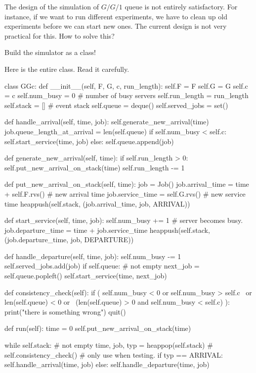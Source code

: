 \documentclass{scrartcl}
\begin{document}
\begin{exercise}
The design of the simulation of $G/G/1$ queue is not entirely satisfactory. For instance, if we want to run different experiments, we have to clean up old experiments before we can start new ones. The current design is not very practical for this. How to solve this?

\hintsymbol\begin{hint}
     Build the simulator as a class!
\end{hint}
\begin{solution}
Here is the entire class. Read it carefully.   


\begin{pyblock}
class GGc:
    def __init__(self, F, G, c, run_length):
        self.F = F
        self.G = G
        self.c = c
        self.num_busy = 0   # number of busy servers
        self.run_length = run_length
        self.stack = [] # event stack
        self.queue = deque()
        self.served_jobs = set()

    def handle_arrival(self, time, job):
        self.generate_new_arrival(time)
        job.queue_length_at_arrival = len(self.queue)
        if self.num_busy < self.c:
            self.start_service(time, job)
        else:
            self.queue.append(job)

    def generate_new_arrival(self, time):
        if self.run_length > 0:
            self.put_new_arrival_on_stack(time)
            self.run_length -= 1

    def put_new_arrival_on_stack(self, time):
        job = Job()
        job.arrival_time = time + self.F.rvs()  # new arrival time
        job.service_time = self.G.rvs()  # new service time
        heappush(self.stack, (job.arrival_time, job, ARRIVAL))

    def start_service(self, time, job):
        self.num_busy += 1  # server becomes busy.
        job.departure_time = time + job.service_time
        heappush(self.stack, (job.departure_time, job, DEPARTURE))

    def handle_departure(self, time, job):
        self.num_busy -= 1
        self.served_jobs.add(job)
        if self.queue:  # not empty
            next_job = self.queue.popleft()
            self.start_service(time, next_job)

    def consistency_check(self):
        if ( self.num_busy < 0 or self.num_busy > self.c \
            or len(self.queue) < 0 or \
            (len(self.queue) > 0 and self.num_busy < self.c) ):
            print("there is something wrong")
            quit()

    def run(self):
        time = 0
        self.put_new_arrival_on_stack(time)

        while self.stack:  # not empty
            time, job, typ = heappop(self.stack)
            # self.consistency_check() # only use when testing.
            if typ == ARRIVAL:
                self.handle_arrival(time, job)
            else:
                self.handle_departure(time, job)


\end{pyblock}
\end{solution}
  
\end{exercise}
\end{document}
